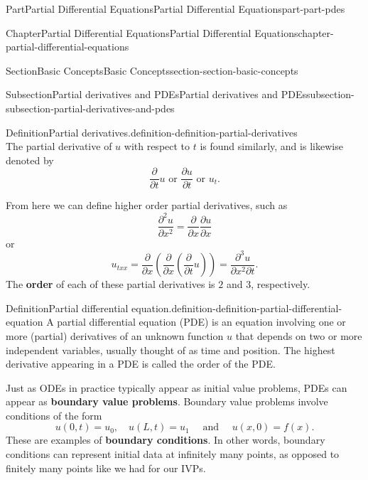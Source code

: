 \documentclass[twoside,10pt,]{book}
\newcommand{\terminology}[1]{\textbf{#1}}
\numberwithin{equation}{part}
\begin{document}
\begin{partptx}{Part}{Partial Differential Equations}{}{Partial Differential Equations}{}{}{part-part-pdes}
\begin{chapterptx}{Chapter}{Partial Differential Equations}{}{Partial Differential Equations}{}{}{chapter-partial-differential-equations}
\begin{sectionptx}{Section}{Basic Concepts}{}{Basic Concepts}{}{}{section-section-basic-concepts}
\begin{subsectionptx}{Subsection}{Partial derivatives and PDEs}{}{Partial derivatives and PDEs}{}{}{subsection-subsection-partial-derivatives-and-pdes}
\begin{definition}{Definition}{Partial derivatives.}{definition-definition-partial-derivatives}
\begin{equation*}
\end{equation*}
The partial derivative of \(u\) with respect to \(t\) is found similarly, and is likewise denoted by%
\begin{equation*}
\frac{\partial}{\partial t}u\text{ or }\frac{\partial u}{\partial t}\text{ or }u_{t}.
\end{equation*}
%
\end{definition}
From here we can define higher order partial derivatives, such as%
\begin{equation*}
\frac{\partial^{2}u}{\partial x^{2}} = \frac{\partial}{\partial x}\frac{\partial u}{\partial x}
\end{equation*}
or%
\begin{equation*}
u_{txx} = \frac{\partial}{\partial x}\left(\frac{\partial}{\partial x}\left(\frac{\partial}{\partial t}u\right)\right) = \frac{\partial^{3}u}{\partial x^{2}\partial t}.
\end{equation*}
The \terminology{order} of each of these partial derivatives is \(2\) and \(3\), respectively.%
\begin{definition}{Definition}{Partial differential equation.}{definition-definition-partial-differential-equation}%
%
A partial differential equation (PDE) is an equation involving one or more (partial) derivatives of an unknown function \(u\) that depends on two or more independent variables, usually thought of as time and position. The highest derivative appearing in a PDE is called the order of the PDE.%
\end{definition}
Just as ODEs in practice typically appear as initial value problems, PDEs can appear as \terminology{boundary value problems}. Boundary value problems involve conditions of the form%
\begin{equation*}
u(0,t) = u_{0},\quad u(L,t) = u_{1} \quad \text{ and }\quad u(x,0) = f(x).
\end{equation*}
These are examples of \terminology{boundary conditions}. In other words, boundary conditions can represent initial data at infinitely many points, as opposed to finitely many points like we had for our IVPs.%
\end{subsectionptx}
%
%
\typeout{************************************************}
\typeout{************************************************}
%

\end{sectionptx}
\end{chapterptx}
\end{partptx}
\end{document}
